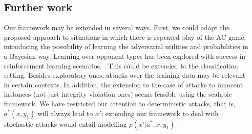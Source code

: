 \subsection{Further work}

Our framework may be extended in several ways. First, we could adapt the proposed approach to situations in which there is repeated play of the AC game, introducing the possibility of learning the adversarial utilities and probabilities in a Bayesian way. Learning over opponent types has been explored with success in reinforcement learning scenarios, \parencite{gallego2019opponent}. This could be extended to the classification setting. Besides exploratory ones, attacks over the training data \parencite{biggio2012poisoning} may be relevant in certain contexts. 
In addition, the extension to the case of attacks to innocent instances (not just integrity violation ones) seems feasible using the scalable framework. %
We have restricted our attention to deterministic attacks, that is, $a^*(x,y_1)$ will always lead to $x'$; extending our framework to deal with stochastic attacks would entail modelling $p(x' \vert a^*, x, y_1)$. 




